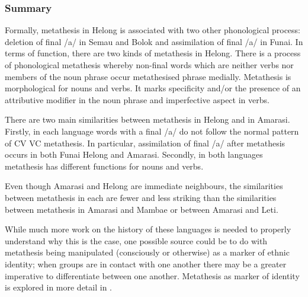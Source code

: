 \subsubsection{Summary}
Formally, metathesis in Helong is associated with
two other phonological process: deletion of final /a/
in Semau and Bolok and assimilation of final /a/ in Funai.
In terms of function, there are two kinds of metathesis in Helong.
There is a process of phonological metathesis whereby
non-final words which are neither verbs nor members of the
noun phrase occur metathesised phrase medially.
Metathesis is morphological for nouns and verbs.
It marks specificity and/or the presence of an attributive modifier
in the noun phrase and imperfective aspect in verbs.

There are two main similarities between metathesis in Helong and in Amarasi.
Firstly, in each language words with a final /a/ do not follow the normal
pattern of CV {\ra} VC metathesis.
In particular, assimilation of final /a/ after metathesis
occurs in both Funai Helong and Amarasi.
Secondly, in both languages metathesis has
different functions for nouns and verbs.

Even though Amarasi and Helong are immediate neighbours,
the similarities between metathesis in each
are fewer and less striking than the similarities between metathesis
in Amarasi and Mambae or between Amarasi and Leti.

While much more work on the history of these languages
is needed to properly understand why this is the case,
one possible source could be to do with metathesis being
manipulated (consciously or otherwise) as a marker of ethnic identity;
when groups are in contact with one another there may be a greater
imperative to differentiate between one another.
Metathesis as marker of identity is explored in more detail in .